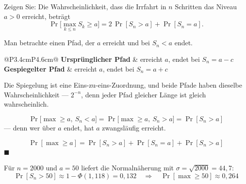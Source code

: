\begin{aufgabe}
Zeigen Sie: Die Wahrscheinlichkeit, dass die Irrfahrt in $n$ Schritten das Niveau $a > 0$ erreicht, beträgt
\[ \Pr\bigl[\max_{k\le n} S_k \ge a\bigr] = 2\,\Pr[S_n > a] + \Pr[S_n = a] . \]

\loesung
{}
Man betrachte einen Pfad, der $a$ erreicht und bei $S_n < a$ endet. 

\begin{center}
{\small
\renewcommand{\arraystretch}{1.5}
\begin{tabular}{@{}P{3.4cm}P{4.6cm}@{}}
\toprule
\textbf{Ursprünglicher Pfad} & erreicht $a$, endet bei $S_n = a - c$\\
\textbf{Gespiegelter Pfad} & erreicht $a$, endet bei $S_n = a + c$\\
\bottomrule
\end{tabular}}
\end{center}
Die Spiegelung ist eine Eins-zu-eins-Zuordnung, und beide Pfade haben dieselbe Wahrscheinlichkeit --- $2^{-n}$, denn jeder Pfad gleicher Länge ist gleich wahrscheinlich.

\[ \Pr\bigl[\max \ge a,\ S_n < a\bigr] = \Pr\bigl[\max \ge a,\ S_n > a\bigr] = \Pr[S_n > a] \]
--- denn wer über $a$ endet, hat $a$ zwangsläufig erreicht.

\[ \Pr[\max \ge a] = \Pr[S_n > a] + \Pr[S_n = a] + \Pr[S_n > a] \]
$\blacksquare$

Für $n = 2000$ und $a = 50$ liefert die Normalnäherung mit $\sigma = \sqrt{2000} = 44{,}7$:
\[ \Pr[S_n > 50] \approx 1-\Phi(1{,}118) = 0{,}132 \quad\Longrightarrow\quad \Pr[\max \ge 50] \approx 0{,}264 \]

\begin{center}
\begin{minipage}{0.88\textwidth}
\end{minipage}
\end{center}
\end{aufgabe}

